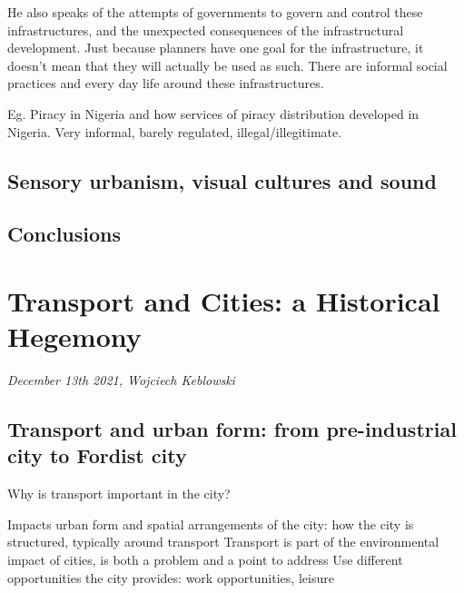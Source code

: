 \documentclass{article}
\begin{document}
He also speaks of the attempts of governments to govern and control these infrastructures, and the unexpected consequences of the infrastructural development. Just because planners have one goal for the infrastructure, it doesn't mean that they will actually be used as such. There are informal social practices and every day life around these infrastructures.

Eg. Piracy in Nigeria and how services of piracy distribution developed in Nigeria. Very informal, barely regulated, illegal/illegitimate. 

\subsection{Sensory urbanism, visual cultures and sound}

\begin{outline}
	\1
\end{outline}

\subsection{Conclusions}

\begin{outline}
	\1
\end{outline}


\section{Transport and Cities: a Historical Hegemony}
\textit{December 13th 2021, Wojciech Keblowski}

\subsection{Transport and urban form: from pre-industrial city to Fordist city}

Why is transport important in the city? 

\begin{outline}
	\1 Impacts urban form and spatial arrangements of the city: how the city is structured, typically around transport
	\1 Transport is part of the environmental impact of cities, is both a problem and a point to address
	\1 Use different opportunities the city provides: work opportunities, leisure
\end{outline}
\end{document}
